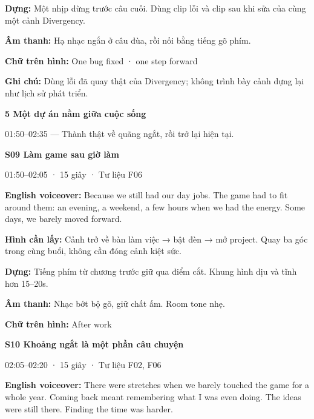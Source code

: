 \documentclass[10pt,a4paper]{article}
\begin{document}
\textbf{Dựng:}  Một nhịp dừng trước câu cuối. Dùng clip lỗi và clip sau khi sửa của cùng một cảnh Divergency.\par

\textbf{Âm thanh:}  Hạ nhạc ngắn ở câu đùa, rồi nối bằng tiếng gõ phím.\par

\textbf{Chữ trên hình:}  One bug fixed · one step forward\par

\textbf{Ghi chú:}  Dùng lỗi đã quay thật của Divergency; không trình bày cảnh dựng lại như lịch sử phát triển.\par

\textbf{5 Một dự án nằm giữa cuộc sống}\par

01:50–02:35 — Thành thật về quãng ngắt, rồi trở lại hiện tại.\par

\textbf{S09 Làm game sau giờ làm}\par

01:50–02:05 · 15 giây · Tư liệu F06\par

\textbf{English voiceover:}  Because we still had our day jobs. The game had to fit around them: an evening, a weekend, a few hours when we had the energy. Some days, we barely moved forward.\par

\textbf{Hình cần lấy:}  Cảnh trở về bàn làm việc → bật đèn → mở project. Quay ba góc trong cùng buổi, không cần đóng cảnh kiệt sức.\par

\textbf{Dựng:}  Tiếng phím từ chương trước giữ qua điểm cắt. Khung hình dịu và tĩnh hơn 15–20s.\par

\textbf{Âm thanh:}  Nhạc bớt bộ gõ, giữ chất ấm. Room tone nhẹ.\par

\textbf{Chữ trên hình:}  After work\par

\textbf{S10 Khoảng ngắt là một phần câu chuyện}\par

02:05–02:20 · 15 giây · Tư liệu F02, F06\par

\textbf{English voiceover:}  There were stretches when we barely touched the game for a whole year. Coming back meant remembering what I was even doing. The ideas were still there. Finding the time was harder.\par
\end{document}
